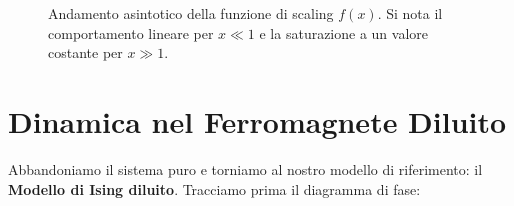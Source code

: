 \begin{figure}[H]
    \centering
    \caption{Andamento asintotico della funzione di scaling $f(x)$. Si nota il comportamento lineare per $x \ll 1$ e la saturazione a un valore costante per $x \gg 1$.}
\end{figure}

\newpage
\section{Dinamica nel Ferromagnete Diluito}
Abbandoniamo il sistema puro e torniamo al nostro modello di riferimento: il \textbf{Modello di Ising diluito}. Tracciamo prima il diagramma di fase:

